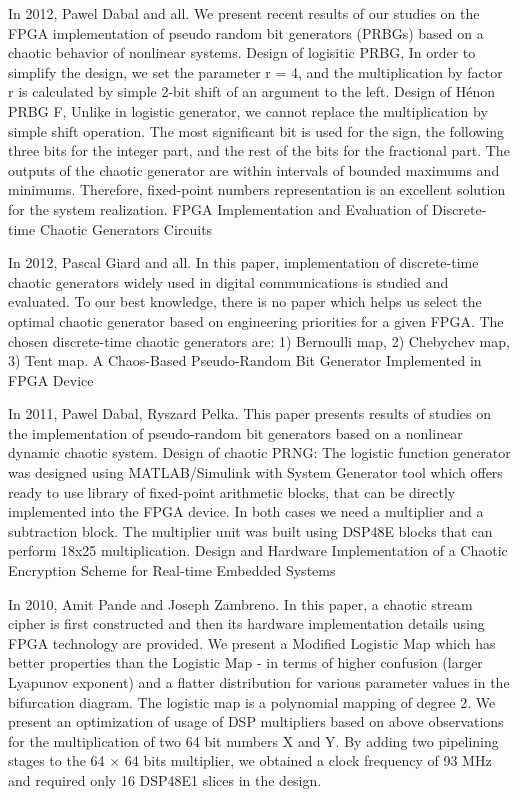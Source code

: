 In 2012, Pawel Dabal and all. We present recent results of our studies on the FPGA implementation of pseudo random bit generators (PRBGs) based on a chaotic behavior of nonlinear systems. Design of logisitic PRBG, In order to simplify the design, we set the parameter r = 4, and the multiplication by factor r is calculated by simple 2-bit shift of an argument to the left. Design of Hénon PRBG F, Unlike in logistic generator, we cannot replace the multiplication by simple shift operation. The most significant bit is used for the sign, the following three bits for the integer part, and the rest of the bits for the fractional part. The outputs of the chaotic generator are within intervals of bounded maximums and minimums. Therefore, fixed-point numbers representation is an excellent solution for the system realization. 
FPGA Implementation and Evaluation of Discrete-time Chaotic Generators Circuits

In 2012, Pascal Giard and all. In this paper, implementation of discrete-time chaotic generators widely used in digital communications is studied and evaluated. To our best knowledge, there is no paper which helps us select the optimal chaotic generator based on engineering priorities for a given FPGA. The chosen discrete-time chaotic generators are: 1) Bernoulli map, 2) Chebychev map, 3) Tent map. 
A Chaos-Based Pseudo-Random Bit Generator Implemented in FPGA Device

In 2011, Pawel Dabal, Ryszard Pelka. This paper presents results of studies on the implementation of pseudo-random bit generators based on a nonlinear dynamic chaotic system. Design of chaotic PRNG: The logistic function generator was designed using MATLAB/Simulink with System Generator tool which offers ready to use library of fixed-point arithmetic blocks, that can be directly implemented into the FPGA device. In both cases we need a multiplier and a subtraction block. The multiplier unit was built using DSP48E blocks that can perform 18x25 multiplication. 
Design and Hardware Implementation of a Chaotic Encryption Scheme for Real-time Embedded Systems

In 2010, Amit Pande and Joseph Zambreno. In this paper, a chaotic stream cipher is first constructed and then its hardware implementation details using FPGA technology are provided. We present a Modified Logistic Map which has better properties than the Logistic Map - in terms of higher confusion (larger Lyapunov exponent) and a flatter distribution for various parameter values in the bifurcation diagram. The logistic map is a polynomial mapping of degree 2. We present an optimization of usage of DSP multipliers based on above observations for the multiplication of two 64 bit numbers X and Y. By adding two pipelining stages to the 64 $\times$ 64 bits multiplier, we obtained a clock frequency of 93 MHz and required only 16 DSP48E1 slices in the design. 


